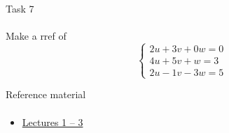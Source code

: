 \documentclass[aspectratio=169]{beamer}
\begin{document}
\begin{frame}[t]{Task 7}
\framesubtitle{}
    Make a rref of
    \begin{equation*}
        \left\{\begin{matrix}
            2u + 3v + 0w = 0 \\ 
            4u + 5v + w = 3 \\ 
            2u - 1v - 3w = 5 
            \end{matrix}\right.
        \end{equation*}
\end{frame}

\begin{frame}[t]{Reference material}
\framesubtitle{}
    \begin{itemize}
        \item \href{https://ocw.mit.edu/courses/mathematics/18-06-linear-algebra-spring-2010/video-lectures/}{Lectures 1 -- 3}
    \end{itemize}
\end{frame}
\end{document}
